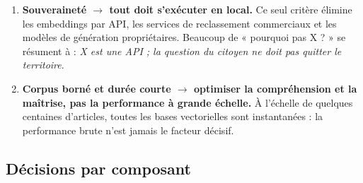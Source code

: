 \begin{enumerate}
    \item \textbf{Souveraineté $\rightarrow$ tout doit s'exécuter en local.} Ce seul critère
    élimine les embeddings par API, les services de reclassement commerciaux et les modèles de
    génération propriétaires. Beaucoup de « pourquoi pas X ? » se résument à : \emph{X est une
    API ; la question du citoyen ne doit pas quitter le territoire}.
    \item \textbf{Corpus borné et durée courte $\rightarrow$ optimiser la compréhension et la
    maîtrise, pas la performance à grande échelle.} À l'échelle de quelques centaines d'articles,
    toutes les bases vectorielles sont instantanées : la performance brute n'est jamais le
    facteur décisif.
\end{enumerate}

\subsection{Décisions par composant}

